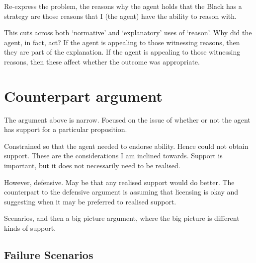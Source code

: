 \documentclass[10pt]{article}
\newcommand{\hozlinedash}[0]{%
  \noindent\hdashrule[0.5ex][c]{\textwidth}{.1pt}{2.5pt}
}
\begin{document}
Re-express the problem, the reasons why the agent holds that the Black has a strategy are those reasons that I (the agent) have the ability to reason with.

This cuts across both `normative' and `explanatory' uses of `reason'.
Why did the agent, in fact, act?
If the agent is appealing to those witnessing reasons, then they are part of the explanation.
If the agent is appealing to those witnessing reasons, then these affect whether the outcome was appropriate.

\hozlinedash



\section{Counterpart argument}
\label{sec:counterpart-argument}

The argument above is narrow.
Focused on the issue of whether or not the agent has support for a particular proposition.

Constrained so that the agent needed to endorse ability.
Hence could not obtain support.
These are the considerations I am inclined towards.
Support is important, but it does not necessarily need to be realised.

However, defensive.
May be that any realised support would do better.
The counterpart to the defensive argument is assuming that licensing is okay and suggesting when it may be preferred to realised support.

Scenarios, and then a big picture argument, where the big picture is different kinds of support.

\subsection{Failure Scenarios}
\label{sec:failure-scenarios}
\end{document}
